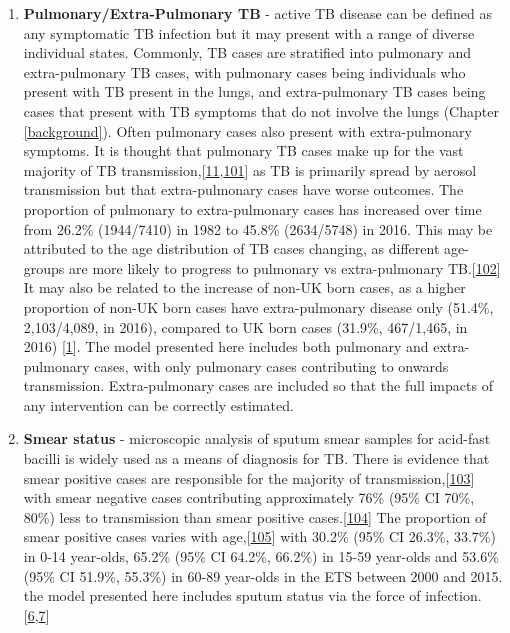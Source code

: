 \documentclass[11pt,twoside]{bristolthesis}
\begin{document}
  \begin{enumerate}
  \def\labelenumi{\arabic{enumi}.}
  \item
    \textbf{Pulmonary/Extra-Pulmonary TB} - active TB disease can be defined as any symptomatic TB infection but it may present with a range of diverse individual states. Commonly, TB cases are stratified into pulmonary and extra-pulmonary TB cases, with pulmonary cases being individuals who present with TB present in the lungs, and extra-pulmonary TB cases being cases that present with TB symptoms that do not involve the lungs (Chapter \ref{background}). Often pulmonary cases also present with extra-pulmonary symptoms. It is thought that pulmonary TB cases make up for the vast majority of TB transmission,{[}\protect\hyperlink{ref-Sepkowitz1996}{11},\protect\hyperlink{ref-Mathema2018}{101}{]} as TB is primarily spread by aerosol transmission but that extra-pulmonary cases have worse outcomes. The proportion of pulmonary to extra-pulmonary cases has increased over time from 26.2\% (1944/7410) in 1982 to 45.8\% (2634/5748) in 2016. This may be attributed to the age distribution of TB cases changing, as different age-groups are more likely to progress to pulmonary vs extra-pulmonary TB.{[}\protect\hyperlink{ref-Lefebvre2017}{102}{]} It may also be related to the increase of non-UK born cases, as a higher proportion of non-UK born cases have extra-pulmonary disease only (51.4\%, 2,103/4,089, in 2016), compared to UK born cases (31.9\%, 467/1,465, in 2016) {[}\protect\hyperlink{ref-PHE2017}{1}{]}. The model presented here includes both pulmonary and extra-pulmonary cases, with only pulmonary cases contributing to onwards transmission. Extra-pulmonary cases are included so that the full impacts of any intervention can be correctly estimated.
  \item
    \textbf{Smear status} - microscopic analysis of sputum smear samples for acid-fast bacilli is widely used as a means of diagnosis for TB. There is evidence that smear positive cases are responsible for the majority of transmission,{[}\protect\hyperlink{ref-PMID:13148535}{103}{]} with smear negative cases contributing approximately 76\% (95\% CI 70\%, 80\%) less to transmission than smear positive cases.{[}\protect\hyperlink{ref-Tostmann2008}{104}{]} The proportion of smear positive cases varies with age,{[}\protect\hyperlink{ref-Piccini2014}{105}{]} with 30.2\% (95\% CI 26.3\%, 33.7\%) in 0-14 year-olds, 65.2\% (95\% CI 64.2\%, 66.2\%) in 15-59 year-olds and 53.6\% (95\% CI 51.9\%, 55.3\%) in 60-89 year-olds in the ETS between 2000 and 2015. the model presented here includes sputum status via the force of infection.{[}\protect\hyperlink{ref-Anderson1991}{6},\protect\hyperlink{ref-Keeling2007}{7}{]}

\end{enumerate}
\end{document}
